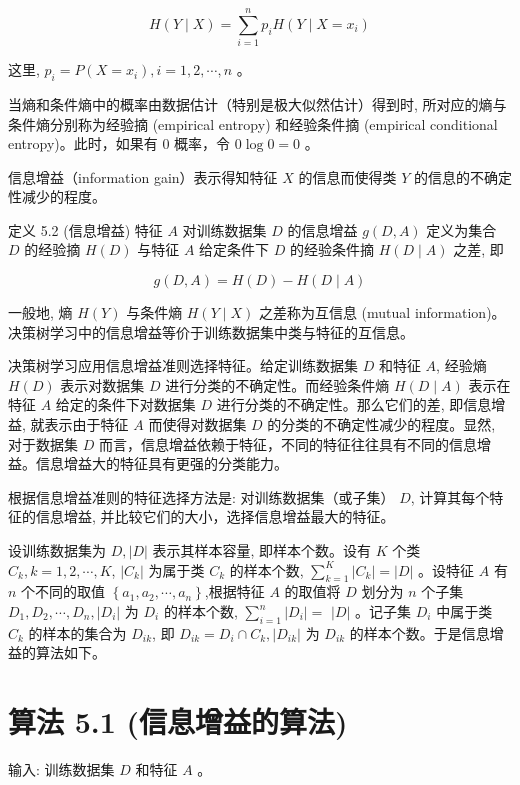 \documentclass[10pt]{article}
\begin{document}
\begin{CJK*}{UTF8}{bsmi}
\begin{equation*}
H(Y \mid X)=\sum_{i=1}^{n} p_{i} H\left(Y \mid X=x_{i}\right) \tag{5.5}
\end{equation*}


这里, $p_{i}=P\left(X=x_{i}\right), i=1,2, \cdots, n$ 。

当熵和条件熵中的概率由数据估计（特别是极大似然估计）得到时, 所对应的熵与条件熵分别称为经验摘 (empirical entropy) 和经验条件摘 (empirical conditional entropy)。此时，如果有 0 概率，令 $0 \log 0=0$ 。

信息增益（information gain）表示得知特征 $X$ 的信息而使得类 $Y$ 的信息的不确定性减少的程度。

定义 5.2 (信息增益) 特征 $A$ 对训练数据集 $D$ 的信息增益 $g(D, A)$ 定义为集合 $D$ 的经验摘 $H(D)$ 与特征 $A$ 给定条件下 $D$ 的经验条件摘 $H(D \mid A)$ 之差, 即


\begin{equation*}
g(D, A)=H(D)-H(D \mid A) \tag{5.6}
\end{equation*}


一般地, 熵 $H(Y)$ 与条件熵 $H(Y \mid X)$ 之差称为互信息 (mutual information)。决策树学习中的信息增益等价于训练数据集中类与特征的互信息。

决策树学习应用信息增益准则选择特征。给定训练数据集 $D$ 和特征 $A$, 经验熵 $H(D)$ 表示对数据集 $D$ 进行分类的不确定性。而经验条件熵 $H(D \mid A)$ 表示在特征 $A$ 给定的条件下对数据集 $D$ 进行分类的不确定性。那么它们的差, 即信息增益, 就表示由于特征 $A$ 而使得对数据集 $D$ 的分类的不确定性减少的程度。显然, 对于数据集 $D$ 而言，信息增益依赖于特征，不同的特征往往具有不同的信息增益。信息增益大的特征具有更强的分类能力。

根据信息增益准则的特征选择方法是: 对训练数据集（或子集） $D$, 计算其每个特征的信息增益, 并比较它们的大小，选择信息增益最大的特征。

设训练数据集为 $D,|D|$ 表示其样本容量, 即样本个数。设有 $K$ 个类 $C_{k}, k=1,2, \cdots, K$, $\left|C_{k}\right|$ 为属于类 $C_{k}$ 的样本个数, $\sum_{k=1}^{K}\left|C_{k}\right|=|D|$ 。设特征 $A$ 有 $n$ 个不同的取值 $\left\{a_{1}, a_{2}, \cdots, a_{n}\right\}$,根据特征 $A$ 的取值将 $D$ 划分为 $n$ 个子集 $D_{1}, D_{2}, \cdots, D_{n},\left|D_{i}\right|$ 为 $D_{i}$ 的样本个数, $\sum_{i=1}^{n}\left|D_{i}\right|=$ $|D|$ 。记子集 $D_{i}$ 中属于类 $C_{k}$ 的样本的集合为 $D_{i k}$, 即 $D_{i k}=D_{i} \cap C_{k},\left|D_{i k}\right|$ 为 $D_{i k}$ 的样本个数。于是信息增益的算法如下。

\section*{算法 5.1 (信息增益的算法)}
输入: 训练数据集 $D$ 和特征 $A$ 。


\end{CJK*}
\end{document}
